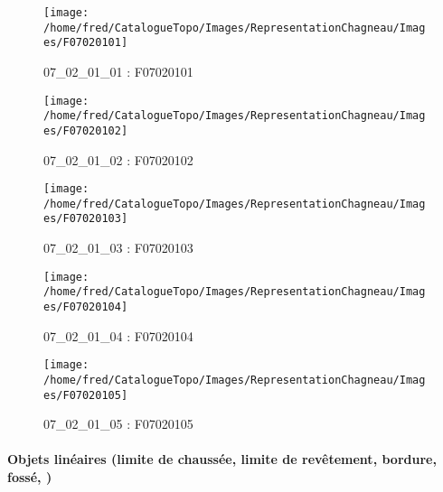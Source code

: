 \documentclass[12pt,titlepage,oneside]{book}
\begin{document}
\begin{figure}[h!]
  \hfill         %
  \begin{minipage}[t]{3cm}
    \begin{center}
      \texttt{[image: /home/fred/CatalogueTopo/Images/RepresentationChagneau/Images/F07020101]}
      \caption[F07020101]{\label{} 07\_02\_01\_01 : F07020101}
    \end{center}
  \end{minipage}
  \begin{minipage}[t]{3cm}
    \begin{center}
      \texttt{[image: /home/fred/CatalogueTopo/Images/RepresentationChagneau/Images/F07020102]}
      \caption[F07020102]{\label{} 07\_02\_01\_02 : F07020102}
    \end{center}
  \end{minipage}
  \begin{minipage}[t]{3cm}
    \begin{center}
      \texttt{[image: /home/fred/CatalogueTopo/Images/RepresentationChagneau/Images/F07020103]}
      \caption[F07020103]{\label{} 07\_02\_01\_03 : F07020103}
    \end{center}
  \end{minipage}
  \begin{minipage}[t]{3cm}
    \begin{center}
      \texttt{[image: /home/fred/CatalogueTopo/Images/RepresentationChagneau/Images/F07020104]}
      \caption[F07020104]{\label{} 07\_02\_01\_04 : F07020104}
    \end{center}
  \end{minipage}
  \begin{minipage}[t]{3cm}
    \begin{center}
      \texttt{[image: /home/fred/CatalogueTopo/Images/RepresentationChagneau/Images/F07020105]}
      \caption[F07020105]{\label{} 07\_02\_01\_05 : F07020105}
    \end{center}
  \end{minipage}
\end{figure}


\paragraph{Objets linéaires (limite de chaussée, limite de revêtement, bordure, fossé, )}
\noindent
\vspace{\baselineskip}
\end{document}
